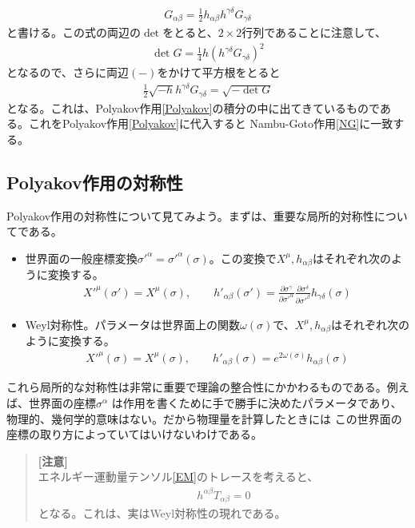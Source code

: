 \documentclass[report,paper=a4, fontsize=12pt, line_length=16cm, number_of_lines=33,dvipdfmx]{jlreq}
\numberwithin{equation}{chapter}
\numberwithin{equation}{section}
\newcommand{\del}{\partial}
\newenvironment{remark}{\begin{quote}\small\textbf{[注意]}\\ }{\end{quote}}
\begin{document}
\begin{align}
G_{\alpha\beta}=\frac12 h_{\alpha\beta}h^{\gamma\delta}G_{\gamma\delta}
\end{align}
と書ける。この式の両辺の$\det$をとると、$2\times 2$行列であることに注意して、
\begin{align}
\det G=\frac14 h (h^{\gamma\delta}G_{\gamma\delta})^2
\end{align}
となるので、さらに両辺$(-)$をかけて平方根をとると
\begin{align}
\frac12 \sqrt{-h}h^{\gamma\delta}G_{\gamma\delta}=\sqrt{-\det G}
\end{align}
となる。これは、Polyakov作用\eqref{Polyakov}の積分の中に出てきているものである。これをPolyakov作用\eqref{Polyakov}に代入すると
Nambu-Goto作用\eqref{NG}に一致する。
\subsection{Polyakov作用の対称性}
Polyakov作用の対称性について見てみよう。まずは、重要な局所的対称性についてである。
\begin{itemize}
\item 世界面の一般座標変換$\sigma'^{\alpha}=\sigma'^{\alpha}(\sigma)$。この変換で$X^{\mu},h_{\alpha\beta}$はそれぞれ次のように変換する。
\begin{align}
X'^\mu(\sigma')=X^{\mu}(\sigma),\qquad
h'_{\alpha\beta}(\sigma') = 
\frac{\del \sigma^{\gamma}}{\del \sigma'^{\alpha}}
\frac{\del \sigma^{\delta}}{\del \sigma'^{\beta}}
h_{\gamma\delta}(\sigma)
\end{align}
\item Weyl対称性。パラメータは世界面上の関数$\omega(\sigma)$で、$X^{\mu},h_{\alpha\beta}$はそれぞれ次のように変換する。
\begin{align}
X'^\mu(\sigma)=X^{\mu}(\sigma),\qquad
h'_{\alpha\beta}(\sigma) =
e^{2\omega(\sigma)}
h_{\alpha\beta}(\sigma)
\end{align}
\end{itemize}
これら局所的な対称性は非常に重要で理論の整合性にかかわるものである。例えば、世界面の座標$\sigma^{\alpha}$
は作用を書くために手で勝手に決めたパラメータであり、物理的、幾何学的意味はない。だから物理量を計算したときには
この世界面の座標の取り方によっていてはいけないわけである。
\begin{remark}
エネルギー運動量テンソル\eqref{EM}のトレースを考えると、
\begin{align}
h^{\alpha\beta}T_{\alpha\beta}=0
\end{align}
となる。これは、実はWeyl対称性の現れである。
\end{remark}
\end{document}
